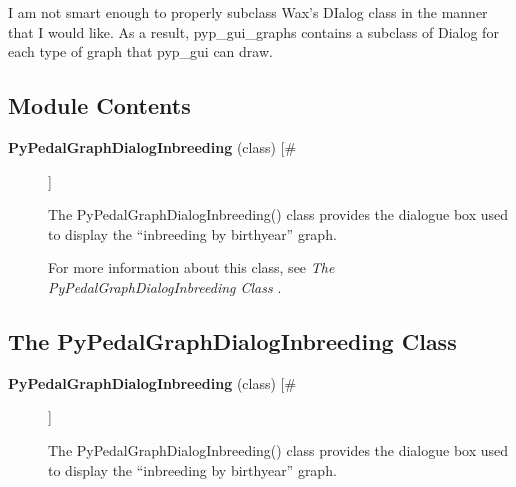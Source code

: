 

 I am not smart enough to properly subclass Wax's DIalog class in the manner that I would like. As a result, pyp\_gui\_graphs contains a subclass of Dialog for each type of graph that pyp\_gui can draw.
\subsection*{Module Contents}
\begin{description}
\item[\textbf{PyPedalGraphDialogInbreeding}
 (class) [\#]]

 The PyPedalGraphDialogInbreeding() class provides the dialogue box used to display the ``inbreeding by birthyear'' graph.


 For more information about this class, see \emph{The PyPedalGraphDialogInbreeding Class}
.


\end{description}
\subsection*{The PyPedalGraphDialogInbreeding Class}
\begin{description}
\item[\textbf{PyPedalGraphDialogInbreeding}
 (class) [\#]]

 The PyPedalGraphDialogInbreeding() class provides the dialogue box used to display the ``inbreeding by birthyear'' graph.


\end{description}

